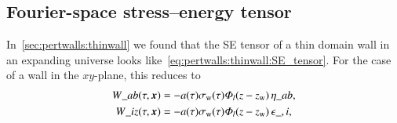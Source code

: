 

\subsection{Fourier-space stress--energy tensor}\label{sec:pertwalls:gws:Fourier_SE_tensor}
    In~\cref{sec:pertwalls:thinwall} we found that the SE tensor of a thin domain wall in an expanding universe looks like~\cref{eq:pertwalls:thinwall:SE_tensor}. For the case of a wall in the $xy$-plane, this reduces to
    \begin{equation}
        \begin{split}
            \Tw\_{ab}(\tau, \vec{x}) 
             &=  -a (\tau)\sigma\ped{w}(\tau) \varPhi_l(z-z\ped{w}) \, \eta\_{ab}, \\
            \Tw\_{iz}(\tau, \vec{x}) 
            &= -a (\tau)\sigma\ped{w}(\tau) \varPhi_l(z-z\ped{w} ) \,\epsilon\_{,i}, %
        \end{split}
    \end{equation}
